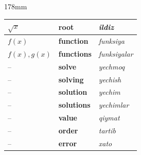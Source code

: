 \documentclass[a4paper]{article}
\begin{document}
\begin{textblock*}{178mm}
{\begin{tabular}{|>{\centering\arraybackslash}p{22mm}|p{68mm}|p{72mm}|}
$\sqrt{x}$ & \textbf{root} & \textit{ildiz} \\ \hline
\rowcolor{badge!18}
$f(x)$ & \textbf{function} & \textit{funksiya} \\ \hline
$f(x), g(x)$ & \textbf{functions} & \textit{funksiyalar} \\ \hline
\rowcolor{badge!18}
-- & \textbf{solve} & \textit{yechmoq} \\ \hline
-- & \textbf{solving} & \textit{yechish} \\ \hline
\rowcolor{badge!18}
-- & \textbf{solution} & \textit{yechim} \\ \hline
-- & \textbf{solutions} & \textit{yechimlar} \\ \hline
\rowcolor{badge!18}
-- & \textbf{value} & \textit{qiymat} \\ \hline
-- & \textbf{order} & \textit{tartib} \\ \hline
\rowcolor{badge!18}
-- & \textbf{error} & \textit{xato} \\ \hline
\end{tabular}
}
\end{textblock*}
\end{document}
